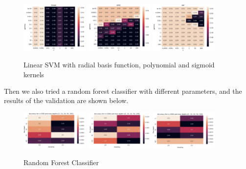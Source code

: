 \documentclass[12pt]{article}
\begin{document}
\begin{figure}[h]
    \centering
    \includegraphics[width=0.3\textwidth]{linear_svm_class}
    \includegraphics[width=0.3\textwidth]{poly_svm_class}
    \includegraphics[width=0.3\textwidth]{rbf_svm_class}
    \caption{Linear SVM with radial basis function, polynomial and sigmoid kernels}
    \label{fig:linear_svm}
\end{figure}

Then we also tried a random forest classifier with different parameters, and the results of the validation
are shown below.

\begin{figure}[h]
    \centering
    \includegraphics[width=0.3\textwidth]{rf_500_class}
    \includegraphics[width=0.3\textwidth]{rf_1000_class}
    \includegraphics[width=0.3\textwidth]{rf_2000_class}
    \caption{Random Forest Classifier}
    \label{fig:random_forest}
\end{figure}
\end{document}
